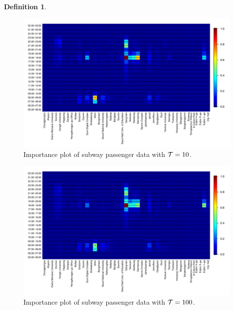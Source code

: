 \documentclass[preprint, review, 12pt]{article}
\theoremstyle{definition}
\newtheorem{dfn}{Definition}
\theoremstyle{remark}
\begin{document}
\begin{dfn}
\begin{figure}
	\centering
	\includegraphics[width=1.05\textwidth]{Fig/In_scale_1.pdf}
	\vspace{-13mm}
	\caption{Importance plot of subway passenger data with ${\cal T}=10$.}
	\label{snow:subway_in_01}
\end{figure}

\begin{figure}
	\centering
	\includegraphics[width=1.05\textwidth]{Fig/In_scale_2.pdf}
	\vspace{-13mm}
	\caption{Importance plot of subway passenger data with ${\cal T}=100$.}
	\label{snow:subway_in_1}
\end{figure}


\end{dfn}
\end{document}
